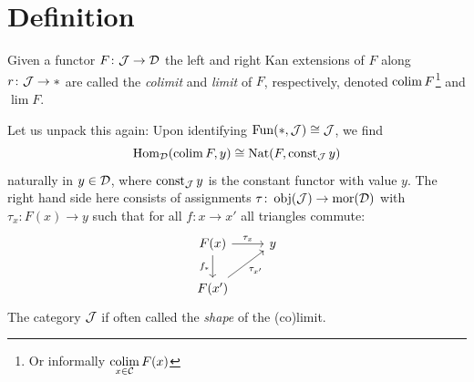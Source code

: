     \section{Definition}
        Given a functor $F \colon \mathcal{J} \to \mathcal{D}$ the left and right Kan extensions of $F$ along $r \colon \mathcal{J} \to *$ are called the \emph{colimit} and \emph{limit} of $F$, respectively, denoted $\operatorname*{colim} F$\footnote{Or informally $\operatorname*{colim} \limits_{x \in \mathcal{C}} F(x)$} and $\lim F$.
        
        Let us unpack this again: Upon identifying $\operatorname{Fun}(*, \mathcal{J}) \cong \mathcal{J}$, we find
        \begin{equation*}
            \operatorname{Hom}_{\mathcal{D}}(\operatorname*{colim} F, y) \cong \operatorname{Nat}(F, \operatorname{const}_{\mathcal{J}} y)
        \end{equation*}
        naturally in $y \in \mathcal{D}$, where $\operatorname{const}_{\mathcal{J}} y$ is the constant functor with value $y$. The right hand side here consists of assignments $\tau \colon \operatorname{obj}(\mathcal{J}) \to \operatorname{mor}(\mathcal{D})$ with $\tau_x \colon F(x) \to y$ such that for all $f \colon x \to x'$ all triangles commute:
        \begin{equation*}
            \begin{tikzcd}
                F(x) \arrow[r, "\tau_x"] \arrow[d, "f_*"'] & y \\
                F(x') \arrow[ru, "\tau_{x'}"']             &  
            \end{tikzcd}
        \end{equation*}
        The category $\mathcal{J}$ if often called the \emph{shape} of the (co)limit.
